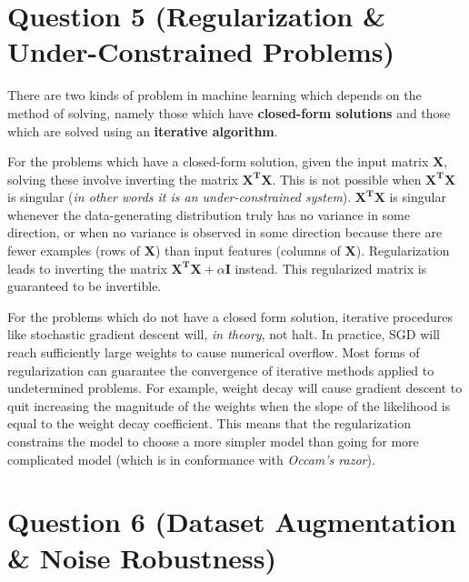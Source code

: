 \documentclass[fleqn]{article}
\begin{document}
\section*{Question 5 (Regularization \& Under-Constrained Problems)}
There are two kinds of problem in machine learning which depends on the method of solving, namely those which have \textbf{closed-form solutions} and those which are solved using an \textbf{iterative algorithm}.

For the problems which have a closed-form solution, given the input matrix $\bm{X}$, solving these involve inverting the matrix $\bm{X^TX}$. This is not possible when $\bm{X^TX}$ is singular (\textit{in other words it is an under-constrained system}). $\bm{X^TX}$ is singular whenever the data-generating distribution truly has no variance in some direction, or when no variance is observed in some direction because there are fewer examples (rows of $\bm{X}$) than input features (columns of $\bm{X}$). Regularization leads to inverting the matrix $\bm{X^TX} + \alpha \bm{I}$ instead. This regularized matrix is guaranteed to be invertible.

For the problems which do not have a closed form solution, iterative procedures like stochastic gradient descent will, \textit{in theory}, not halt. In practice, SGD will reach sufficiently large weights to cause numerical overflow. Most forms of regularization can guarantee the convergence of iterative methods applied to undetermined problems. For example, weight decay will cause gradient descent to quit increasing the magnitude of the weights when the slope of the likelihood is equal to the weight decay coefficient.
This means that the regularization constrains the model to choose a more simpler model than going for more complicated model (which is in conformance with \textit{Occam's razor}).

\section*{Question 6 (Dataset Augmentation \& Noise Robustness)}
\end{document}
